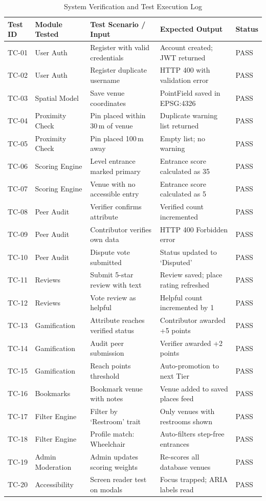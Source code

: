 \documentclass[12pt,a4paper]{report}
\begin{document}
\begin{table}[htbp]
\centering
\caption{System Verification and Test Execution Log}
\label{tab:test_cases}
\scriptsize
\begin{tabularx}{\textwidth}{p{1.2cm}p{2.8cm}p{3.5cm}p{3.5cm}l}
\toprule
\textbf{Test ID} & \textbf{Module Tested} & \textbf{Test Scenario / Input} & \textbf{Expected Output} & \textbf{Status} \\
\midrule
TC-01 & User Auth & Register with valid credentials & Account created; JWT returned & PASS \\
TC-02 & User Auth & Register duplicate username & HTTP 400 with validation error & PASS \\
TC-03 & Spatial Model & Save venue coordinates & PointField saved in EPSG:4326 & PASS \\
TC-04 & Proximity Check & Pin placed within 30\,m of venue & Duplicate warning list returned & PASS \\
TC-05 & Proximity Check & Pin placed 100\,m away & Empty list; no warning & PASS \\
TC-06 & Scoring Engine & Level entrance marked primary & Entrance score calculated as 35 & PASS \\
TC-07 & Scoring Engine & Venue with no accessible entry & Entrance score calculated as 5 & PASS \\
TC-08 & Peer Audit & Verifier confirms attribute & Verified count incremented & PASS \\
TC-09 & Peer Audit & Contributor verifies own data & HTTP 400 Forbidden error & PASS \\
TC-10 & Peer Audit & Dispute vote submitted & Status updated to `Disputed' & PASS \\
TC-11 & Reviews & Submit 5-star review with text & Review saved; place rating refreshed & PASS \\
TC-12 & Reviews & Vote review as helpful & Helpful count incremented by 1 & PASS \\
TC-13 & Gamification & Attribute reaches verified status & Contributor awarded +5 points & PASS \\
TC-14 & Gamification & Audit peer submission & Verifier awarded +2 points & PASS \\
TC-15 & Gamification & Reach points threshold & Auto-promotion to next Tier & PASS \\
TC-16 & Bookmarks & Bookmark venue with notes & Venue added to saved places feed & PASS \\
TC-17 & Filter Engine & Filter by `Restroom' trait & Only venues with restrooms shown & PASS \\
TC-18 & Filter Engine & Profile match: Wheelchair & Auto-filters step-free entrances & PASS \\
TC-19 & Admin Moderation & Admin updates scoring weights & Re-scores all database venues & PASS \\
TC-20 & Accessibility & Screen reader test on modals & Focus trapped; ARIA labels read & PASS \\
\bottomrule
\end{tabularx}
\end{table}
\end{document}
